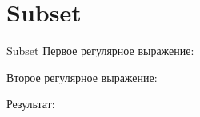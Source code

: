 \section{Subset}
\begin{frame}{Subset}
	Первое регулярное выражение:

	Второе регулярное выражение:

	Результат:

\end{frame}
